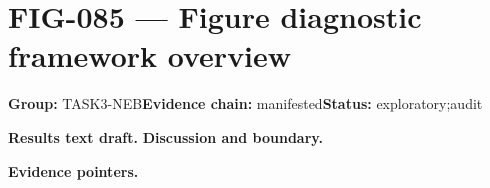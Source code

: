 \clearpage
\section{FIG-085 --- Figure diagnostic framework overview}
\label{figpage:fig-085}
\textbf{Group:} TASK3-NEB\quad \textbf{Evidence chain:} manifested\quad \textbf{Status:} exploratory;audit

\textbf{Results text draft.} 
\textbf{Discussion and boundary.} 


\textbf{Evidence pointers.}



\vfill
